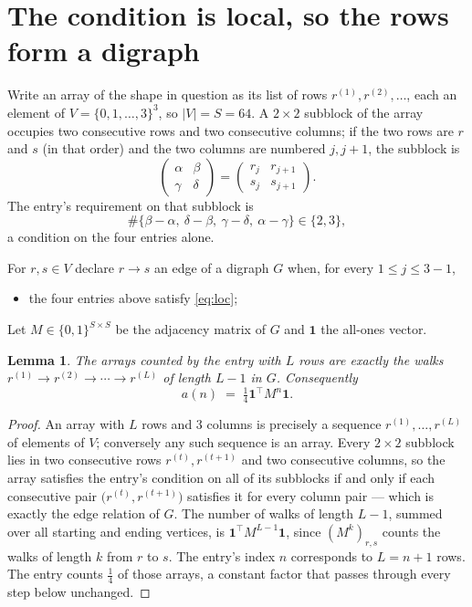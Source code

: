 \documentclass[11pt,a4paper]{article}
\theoremstyle{plain}
\newtheorem{lemma}[theorem]{Lemma}
\theoremstyle{definition}
\begin{document}
\section{The condition is local, so the rows form a digraph}

Write an array of the shape in question as its list of rows
$r^{(1)},r^{(2)},\dots$, each an element of
$V=\{0,1,\dots,3\}^{3}$, so $|V|=S=64$. A $2\times2$ subblock of the array
occupies two consecutive rows and two consecutive columns; if the two rows are $r$
and $s$ (in that order) and the two columns are numbered $j,j+1$,
the subblock is
\[
\begin{pmatrix}\alpha&\beta\\\gamma&\delta\end{pmatrix}=\begin{pmatrix}r_j&r_{j+1}\\s_j&s_{j+1}\end{pmatrix}.
\]
The entry's requirement on that subblock is
\begin{equation}\label{eq:loc}
\#\{\beta-\alpha,\ \delta-\beta,\ \gamma-\delta,\ \alpha-\gamma\}\in\{2,3\},
\end{equation}
a condition on the four entries alone.

For $r,s\in V$ declare $r\to s$ an edge of a digraph $G$ when, for every
$1\le j\le 3-1$,
\begin{itemize}
\item the four entries above satisfy \eqref{eq:loc};

\end{itemize}
Let $M\in\{0,1\}^{S\times S}$ be the adjacency matrix of $G$ and $\mathbf{1}$ the
all-ones vector.

\begin{lemma}\label{lem:walk}
The arrays counted by the entry with $L$ rows are exactly the walks
$r^{(1)}\to r^{(2)}\to\cdots\to r^{(L)}$ of length $L-1$ in $G$. Consequently
\[
a(n)\;=\;\tfrac1{4}\mathbf{1}^{\!\top}M^{n}\mathbf{1} .
\]
\end{lemma}

\begin{proof}
An array with $L$ rows and $3$ columns is precisely a sequence
$r^{(1)},\dots,r^{(L)}$ of elements of $V$; conversely any such sequence is an array.
Every $2\times2$ subblock lies in two consecutive rows $r^{(t)},r^{(t+1)}$ and two
consecutive columns, so the array satisfies the entry's condition on all of its subblocks
if and only if each consecutive pair $\bigl(r^{(t)},r^{(t+1)}\bigr)$ satisfies it for
every column pair --- which is exactly the edge relation of $G$. The number of walks of
length $L-1$, summed over all starting and ending vertices, is
$\mathbf{1}^{\!\top}M^{L-1}\mathbf{1}$, since $(M^{k})_{r,s}$ counts the walks of
length $k$ from $r$ to $s$. The entry's index $n$ corresponds to $L=n+1$ rows. The entry counts $\tfrac1{4}$ of those arrays, a constant factor that passes through every step below unchanged.
\end{proof}
\end{document}
